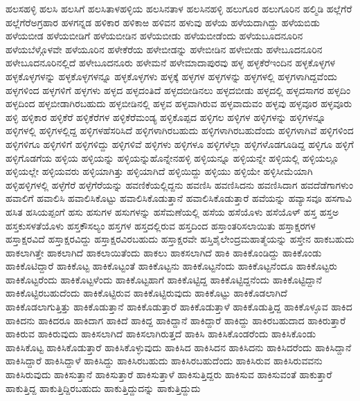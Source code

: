 {ಹಲಸಹಳ್ಳಿ
ಹಲಸಿ
ಹಲಸಿಗೆ
ಹಲಸಿತಾಳಹಳ್ಳಿಯ
ಹಲಸಿನತಾಳ
ಹಲಸಿನಹಳ್ಳಿ
ಹಲುಗೂರ
ಹಲುಗೂರಿನ
ಹಲ್ಮಿಡಿ
ಹಲ್ಲೆಗೆರೆ
ಹಲ್ಲೆಗೆರೆಅಗ್ರಹಾರ
ಹಳಗನ್ನಡ
ಹಳಿಕಾರ
ಹಳಿಕಾಱ
ಹಳಿವನ
ಹಳುವು
ಹಳೆಯ
ಹಳೆಯದಾಗಿದ್ದು
ಹಳೆಯಬಿಡು
ಹಳೆಯಬೀಡ
ಹಳೆಯಬೀಡಿಗೆ
ಹಳೆಯಬೀಡಿನ
ಹಳೆಯಬೀಡು
ಹಳೆಯಬೀಡೆಂದು
ಹಳೆಯಬೂದನೂರಿನ
ಹಳೆಯಬೆಳ್ಗೊಳವೇ
ಹಳೆಯೂರಿನ
ಹಳೇಕೆರೆಯ
ಹಳೇಬೀಡನ್ನು
ಹಳೇಬೀಡಿನ
ಹಳೇಬೀಡು
ಹಳೇಬೂದನೂರಿನ
ಹಳೇಬೂದನೂರಿನಲ್ಲಿದೆ
ಹಳೇಬೂದನೂರು
ಹಳೇಮನೆ
ಹಳೇಮಾದಾಪುರವು
ಹಳ್ಳ
ಹಳ್ಳಕೆರೆಇಂದಿನ
ಹಳ್ಳಕೊಳ್ಳಗಳ
ಹಳ್ಳಕೊಳ್ಳಗಳನ್ನು
ಹಳ್ಳಕೊಳ್ಳಗಳನ್ನೂ
ಹಳ್ಳಕೊಳ್ಳಗಳು
ಹಳ್ಳಕ್ಕೆ
ಹಳ್ಳಗಳ
ಹಳ್ಳಗಳನ್ನು
ಹಳ್ಳಗಳಲ್ಲಿ
ಹಳ್ಳಗಳಾಗಿದ್ದವೆಂದು
ಹಳ್ಳಗಳಿಂದ
ಹಳ್ಳಗಳಿಗೆ
ಹಳ್ಳಗಳು
ಹಳ್ಳದ
ಹಳ್ಳದಂತಿದೆ
ಹಳ್ಳದಬೀಡಿನಲು
ಹಳ್ಳದಬೀಡು
ಹಳ್ಳದಲ್ಲಿ
ಹಳ್ಳದಸಾಗರ
ಹಳ್ಳದಿಂ
ಹಳ್ಳದಿಂದ
ಹಳ್ಳಬೀಡಾಗಿರಬಹುದು
ಹಳ್ಳಬೀಡಿನಲ್ಲಿ
ಹಳ್ಳವ
ಹಳ್ಳವಾಗಿರುವ
ಹಳ್ಳವಾದುವಂ
ಹಳ್ಳವು
ಹಳ್ಳವೂರ
ಹಳ್ಳವೂರು
ಹಳ್ಳಿ
ಹಳ್ಳಿಕಾರ
ಹಳ್ಳಿಕೆರೆ
ಹಳ್ಳಿಕೆರೆಗಳ
ಹಳ್ಳಿಕೆರೆಮಂಡ್ಯ
ಹಳ್ಳಿಕೊಪ್ಪದ
ಹಳ್ಳಿಗಲ
ಹಳ್ಳಿಗಳ
ಹಳ್ಳಿಗಳನ್ನು
ಹಳ್ಳಿಗಳನ್ನೂ
ಹಳ್ಳಿಗಳಲ್ಲಿ
ಹಳ್ಳಿಗಳಲ್ಲಿದ್ದ
ಹಳ್ಳಿಗಳಹೆಸರಿಸಿದೆ
ಹಳ್ಳಿಗಳಾಗಿರಬಹುದು
ಹಳ್ಳಿಗಳಾಗಿರಬಹುದೆಂದು
ಹಳ್ಳಿಗಳಾಗಿವೆ
ಹಳ್ಳಿಗಳಿಂದ
ಹಳ್ಳಿಗಳಿಗೂ
ಹಳ್ಳಿಗಳಿಗೆ
ಹಳ್ಳಿಗಳಿದ್ದು
ಹಳ್ಳಿಗಳಿವೆ
ಹಳ್ಳಿಗಳು
ಹಳ್ಳಿಗಳೂ
ಹಳ್ಳಿಗಳೆಲ್ಲಾ
ಹಳ್ಳಿಗಳೊಡಗೂಡಿದ್ದ
ಹಳ್ಳಿಗೂ
ಹಳ್ಳಿಗೆ
ಹಳ್ಳಿಗೊಡಗೆಯ
ಹಳ್ಳಿಯ
ಹಳ್ಳಿಯನ್ನು
ಹಳ್ಳಿಯನ್ನುಹೊನ್ನೇನಹಳ್ಳಿ
ಹಳ್ಳಿಯನ್ನೂ
ಹಳ್ಳಿಯನ್ನೇ
ಹಳ್ಳಿಯಲ್ಲಿ
ಹಳ್ಳಿಯಲ್ಲೂ
ಹಳ್ಳಿಯಲ್ಲೇ
ಹಳ್ಳಿಯವರು
ಹಳ್ಳಿಯಾಗಿತ್ತು
ಹಳ್ಳಿಯಾಗಿದೆ
ಹಳ್ಳಿಯಿದ್ದು
ಹಳ್ಳಿಯು
ಹಳ್ಳಿಯೇ
ಹಳ್ಳಿಸೀಮೆಯಾಗಿ
ಹಳ್ಳಿಹಳ್ಳಿಗಳಲ್ಲಿ
ಹಳ್ಳೆಗೆರೆ
ಹಳ್ಳೆಗೆರೆಯನ್ನು
ಹವಣಿಕೆಯಲ್ಲಿದ್ದನು
ಹವಣಿಸಿ
ಹವಣಿಸಿದನು
ಹವಣಿಸಿದಾಗ
ಹವದೆಡೆಗಾಗಳುಂ
ಹವಾಲಿಗೆ
ಹವಾಲಿಸಿ
ಹವಾಲಿಸಿಕೊಟ್ಟು
ಹವಾಲಿಸಿಕೊಡುತ್ತಾನೆ
ಹವಾಲಿಸಿಕೊಡುತ್ತಾರೆ
ಹವೆಯನ್ನು
ಹವ್ಯಾಸವೂ
ಹಸಗಾವಿ
ಹಸಿತ
ಹಸಿಯಪ್ಪಂಗೆ
ಹಸು
ಹಸುಗಳ
ಹಸುಗಳನ್ನು
ಹಸೆಮಣೆಯಲ್ಲಿ
ಹಸೆಯ
ಹಸೆಯೊಳು
ಹಸೆಯೊಳ್
ಹಸ್ತ
ಹಸ್ತಅ
ಹಸ್ತಕುಸಳತೆಯೊಳು
ಹಸ್ತಕೌಸಲ್ಯಂ
ಹಸ್ತಗಳ
ಹಸ್ತದಲ್ಲಿರುವ
ಹಸ್ತದಿಂದ
ಹಸ್ತಾಂತರಿಸಲಾಯಿತು
ಹಸ್ತಾಕ್ಷರಗಳ
ಹಸ್ತಾಕ್ಷರವಿದೆ
ಹಸ್ತಾಕ್ಷರವಿದ್ದು
ಹಸ್ತಾಕ್ಷರವಿರಬಹುದು
ಹಸ್ತಾಕ್ಷರವೇ
ಹಸ್ತಿಶೈಲೇಂದ್ರಮಹಾತ್ಮೆಯನ್ನು
ಹಸ್ತೇನ
ಹಾಕಬಹುದು
ಹಾಕಲಾಗಿತ್ತೇ
ಹಾಕಲಾಗಿದೆ
ಹಾಕಲಾಯಿತೆಂದು
ಹಾಕಲು
ಹಾಕಸಲಾಗಿದೆ
ಹಾಕಿ
ಹಾಕಿಕೊಂಡಿದ್ದು
ಹಾಕಿಕೊಂಡು
ಹಾಕಿಕೊಟಿದ್ದಾರೆ
ಹಾಕಿಕೊಟ್ಟ
ಹಾಕಿಕೊಟ್ಟಂತೆ
ಹಾಕಿಕೊಟ್ಟನು
ಹಾಕಿಕೊಟ್ಟನೆಂದು
ಹಾಕಿಕೊಟ್ಟನೆಂದೂ
ಹಾಕಿಕೊಟ್ಟರು
ಹಾಕಿಕೊಟ್ಟರೆಂದು
ಹಾಕಿಕೊಟ್ಟಳೆಂದು
ಹಾಕಿಕೊಟ್ಟಹಾಗೆ
ಹಾಕಿಕೊಟ್ಟಿದ್ದ
ಹಾಕಿಕೊಟ್ಟಿದ್ದನೆಂದು
ಹಾಕಿಕೊಟ್ಟಿದ್ದಾನೆ
ಹಾಕಿಕೊಟ್ಟಿರಬಹುದೆಂದು
ಹಾಕಿಕೊಟ್ಟಿರುವ
ಹಾಕಿಕೊಟ್ಟಿರುವುದು
ಹಾಕಿಕೊಟ್ಟು
ಹಾಕಿಕೊಡಲಾಗಿದೆ
ಹಾಕಿಕೊಡಲಾಗುತ್ತಿತ್ತು
ಹಾಕಿಕೊಡುತ್ತಾನೆ
ಹಾಕಿಕೊಡುತ್ತಾರೆ
ಹಾಕಿಕೊಡುತ್ತಾಳೆ
ಹಾಕಿಕೊಡುತ್ತಿದ್ದ
ಹಾಕಿಕೊಳ್ಳೂವ
ಹಾಕಿದ
ಹಾಕಿದನು
ಹಾಕಿದರೂ
ಹಾಕಿದಾಗ
ಹಾಕಿದೆ
ಹಾಕಿದ್ದ
ಹಾಕಿದ್ದಾನೆ
ಹಾಕಿದ್ದಾರೆ
ಹಾಕಿದ್ದು
ಹಾಕಿರಬಹುದಾದ
ಹಾಕಿರುತ್ತಾರೆ
ಹಾಕಿರುವ
ಹಾಕಿರುವುದು
ಹಾಕಿಸಲಾಗಿದೆ
ಹಾಕಿಸಲಾಗಿರುತ್ತದೆ
ಹಾಕಿಸಿ
ಹಾಕಿಸಿಕೊಂಡರೆಂದು
ಹಾಕಿಸಿಕೊಂಡು
ಹಾಕಿಸಿಕೊಟ್ಟ
ಹಾಕಿಸಿಕೊಡುತ್ತಾರೆ
ಹಾಕಿಸಿಕೊಳ್ಳುವುದು
ಹಾಕಿಸಿದ
ಹಾಕಿಸಿದನ
ಹಾಕಿಸಿದನು
ಹಾಕಿಸಿದರೆಂದು
ಹಾಕಿಸಿದ್ದಾನೆ
ಹಾಕಿಸಿದ್ದಾರೆ
ಹಾಕಿಸಿದ್ದಾಳೆ
ಹಾಕಿಸಿದ್ದು
ಹಾಕಿಸಿರಬಹುದು
ಹಾಕಿಸಿರಬಹುದೆಂದು
ಹಾಕಿಸಿರುವ
ಹಾಕಿಸಿರುವವನು
ಹಾಕಿಸಿರುವುದು
ಹಾಕಿಸುತ್ತಾನೆ
ಹಾಕಿಸುತ್ತಾರೆ
ಹಾಕಿಸುತ್ತಾಳೆ
ಹಾಕಿಸುತ್ತಿದ್ದರು
ಹಾಕಿಸುವ
ಹಾಕಿಸುವಂತೆ
ಹಾಕುತ್ತಾರೆ
ಹಾಕುತ್ತಿದ್ದ
ಹಾಕುತ್ತಿದ್ದಿರಬಹುದು
ಹಾಕುತ್ತಿದ್ದುದನ್ನು
ಹಾಕುತ್ತಿದ್ದುದು
}
